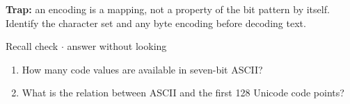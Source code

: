 \documentclass[11pt]{article}
\begin{document}
\begin{keepsection}
\begin{keepsection}
\begin{notebox}\textbf{Trap:} an encoding is a mapping, not a property of the bit pattern by itself. Identify the character set and any byte encoding before decoding text.\end{notebox}

\begin{recallbox}{Recall check \ensuremath{\cdot} answer without looking}
\begin{enumerate}
\item How many code values are available in seven-bit ASCII?
\item What is the relation between ASCII and the first 128 Unicode code points?
\end{enumerate}

\end{recallbox}
\end{keepsection}
\end{keepsection}
\end{document}
